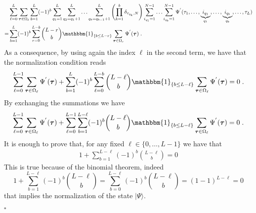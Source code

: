 \documentclass[10pt]{article}
\numberwithin{equation}{section}
\numberwithin{equation}{subsection}
\newcommand{\dt}{\;.}
\begin{document}
\begin{align}
&\sum_{\ell=0}^{L}\sum_{\bm{\tau}\in \Omega_{\ell}}\sum_{b=1}^{L}(-1)^{b}\sum_{q_{1}=1}^{L}\sum_{q_{2}=q_{1}+1}^{L}\ldots\sum_{q_{b}=q_{b-1}+1}^{L}\left(\prod_{k=1}^{b}\delta_{\tau_{q_{k}},N}\right)\sum_{i_{q_{1}}=1}^{N-1}\ldots\sum_{i_{q_{b}}=1}^{N-1}\Psi^{'}(\tau_{1},\ldots,\underbrace{i_{q_{1}}}_{q_{1}},\ldots,\underbrace{i_{q_{b}}}_{q_{b}},\ldots,\tau_{L})\nonumber\\
=&\sum_{b=1}^{L}(-1)^{b}\sum_{r=0}^{L-b}\binom{L-r}{b}\mathbbm{1}_{\{b\leq L-r\}}\sum_{\bm{\tau}\in \Omega_{r}}\Psi^{'}(\bm{\tau})\dt
\end{align} 
As a consequence, by using again the index $\ell$ in the second term, we have that the normalization condition reads
\begin{align}
\sum_{\ell=0}^{L-1}\sum_{\bm{\tau}\in \Omega_{\ell}}\Psi^{'}(\bm{\tau})+\sum_{b=1}^{L}(-1)^{b}\sum_{\ell=0}^{L-b}\binom{L-\ell}{b}\mathbbm{1}_{\{b\leq L-\ell\}}\sum_{\bm{\tau}\in \Omega_{\ell}}\Psi^{'}(\bm{\tau})=0\dt
\end{align}
By exchanging the summations we have 
\begin{equation}
\sum_{\ell=0}^{L-1}\sum_{\bm{\tau}\in \Omega_{\ell}}\Psi^{'}(\bm{\tau})+\sum_{\ell=0}^{L-1}\sum_{b=1}^{L-\ell}(-1)^{b}\binom{L-\ell}{b}\mathbbm{1}_{\{b\leq L-\ell\}}\sum_{\bm{\tau}\in \Omega_{\ell}}\Psi^{'}(\bm{\tau})=0\dt
\end{equation}
It is enough to prove that, for any fixed $\ell\in\{0,\ldots, L-1\}$ we have that 
\begin{align}
	1+\sum_{b=1}^{L-\ell}(-1)^{b}\binom{L-\ell}{b}=0
\end{align}
This is true because of the binomial theorem, indeed 
\begin{equation}
1+\sum_{b=1}^{L-\ell}(-1)^{b}\binom{L-\ell}{b}=\sum_{b=0}^{L-\ell}(-1)^{b}\binom{L-\ell}{b}=(1-1)^{L-\ell}=0
\end{equation}
that implies the normalization of the state $|\Psi\rangle$. 
\begin{flushright}
	$\square$
\end{flushright}
\end{document}
